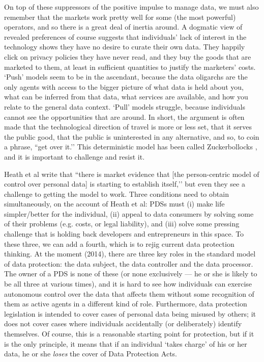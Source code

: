 \documentclass[graybox]{svmult}
\begin{document}
On top of these suppressors of the positive impulse to manage data, we must also remember that the markets work pretty well for some (the most powerful) operators, and so there is a great deal of inertia around. A dogmatic view of revealed preferences of course suggests that individuals’ lack of interest in the technology shows they have no desire to curate their own data. They happily click on privacy policies they have never read, and they buy the goods that are marketed to them, at least in sufficient quantities to justify the marketers’ costs. `Push’ models seem to be in the ascendant, because the data oligarchs are the only agents with access to the bigger picture of what data is held about you, what can be inferred from that data, what services are available, and how you relate to the general data context. `Pull’ models struggle, because individuals cannot see the opportunities that are around. In short, the argument is often made that the technological direction of travel is more or less set, that it serves the public good, that the public is uninterested in any alternative, and so, to coin a phrase, ``get over it.’’ This deterministic model has been called Zuckerbollocks \cite{ohara2013}, and it is important to challenge and resist it.


Heath et al write \cite{heath2013} that ``there is market evidence that [the person-centric model of control over personal data] is starting to establish itself,’’ but even they see a challenge to getting the model to work. Three conditions need to obtain simultaneously, on the account of Heath et al: PDSs must (i) make life simpler/better for the individual, (ii) appeal to data consumers by solving some of their problems (e.g. costs, or legal liability), and (iii) solve some pressing challenge that is holding back developers and entrepreneurs in this space. To these three, we can add a fourth, which is to rejig current data protection thinking. At the moment (2014), there are three key roles in the standard model of data protection: the data subject, the data controller and the data processor. The owner of a PDS is none of these (or none exclusively --- he or she is likely to be all three at various times), and it is hard to see how individuals can exercise autonomous control over the data that affects them without some recognition of them as active agents in a different kind of role. Furthermore, data protection legislation is intended to cover cases of personal data being misused by others; it does not cover cases where individuals accidentally (or deliberately) identify themselves. Of course, this is a reasonable starting point for protection, but if it is the only principle, it means that if an individual `takes charge’ of his or her data, he or she {\em loses} the cover of Data Protection Acts.
\end{document}
